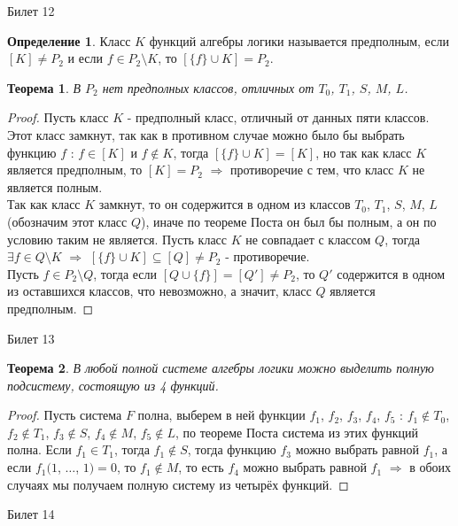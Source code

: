 \documentclass[a4paper, 12pt]{article}
\theoremstyle{definition}
\newtheorem*{definition}{Определение}
\theoremstyle{plain}
\newtheorem*{theorem}{Теорема}
\theoremstyle{remark}
\begin{document}
  \begin{center}
    Билет 12
  \end{center}
  \begin{definition}
    Класс $K$ функций алгебры логики называется предполным, если $[K]\neq P_2$ и если $f\in P_2\setminus K$, то $[\{f\}\cup K]=P_2$.
  \end{definition}
  \begin{theorem}
    В $P_2$ нет предполных классов, отличных от $T_0$, $T_1$, $S$, $M$, $L$.
  \end{theorem}
  \begin{proof}
    Пусть класс $K$ - предполный класс, отличный от данных пяти классов. Этот класс замкнут, так как в противном случае можно было бы выбрать функцию $f$ : $f\in[K]$ и $f\notin K$, тогда $[\{f\}\cup K]=[K]$, но так как класс $K$ является предполным, то $[K]=P_2$ $\Longrightarrow$ противоречие с тем, что класс $K$ не является полным.\\
    Так как класс $K$ замкнут, то он содержится в одном из классов $T_0$, $T_1$, $S$, $M$, $L$ (обозначим этот класс $Q$), иначе по теореме Поста он был бы полным, а он по условию таким не является. Пусть класс $K$ не совпадает с классом $Q$, тогда $\exists f\in Q\setminus K$ $\Longrightarrow$ $[\{f\}\cup K]\subseteq[Q]\neq P_2$ - противоречие.\\
    Пусть $f\in P_2\setminus Q$, тогда если $[Q\cup\{f\}]=[Q']\neq P_2$, то $Q'$ содержится в одном из оставшихся классов, что невозможно, а значит, класс $Q$ является предполным.
  \end{proof}
  \begin{center}
    Билет 13
  \end{center}
  \begin{theorem}
    В любой полной системе алгебры логики можно выделить полную подсистему, состоящую из 4 функций.
  \end{theorem}
  \begin{proof}
    Пусть система $F$ полна, выберем в ней функции $f_1$, $f_2$, $f_3$, $f_4$, $f_5$ : $f_1\notin T_0$, $f_2\notin T_1$, $f_3\notin S$, $f_4\notin M$, $f_5\notin L$, по теореме Поста система из этих функций полна. Если $f_1\in T_1$, тогда $f_1\notin S$, тогда функцию $f_3$ можно выбрать равной $f_1$, а если $f_1(1$, $\ldots$, $1)=0$, то $f_1\notin M$, то есть $f_4$ можно выбрать равной $f_1$ $\Longrightarrow$ в обоих случаях мы получаем полную систему из четырёх функций.
  \end{proof}
  \begin{center}
    Билет 14
  \end{center}
\end{document}
